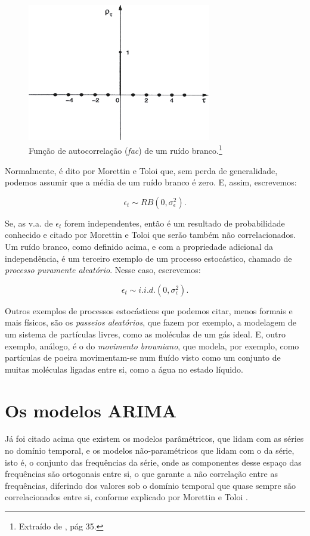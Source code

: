 \begin{figure}[htb]
\centering
\includegraphics[width=8cm]{figuras/fac_ruido}
\caption{Função de autocorrelação (\emph{fac}) de um ruído branco.\footnote{Extraído de \citep{morettin}, pág 35.}}
\label{fig:fac_ruido}
\end{figure}

Normalmente, é dito por Morettin e Toloi \citep{morettin} que, sem perda de generalidade, podemos assumir que a média de um ruído branco é zero. E, assim, escrevemos:

\[ \epsilon_t \sim RB (0, \sigma_\epsilon^2). \]

Se, as v.a. de $\epsilon_t$ forem independentes, então é um resultado de probabilidade conhecido e citado por Morettin e Toloi \citep{morettin} que serão também não correlacionados. Um ruído branco, como definido acima, e com a propriedade adicional da independência, é um terceiro exemplo de um processo estocástico, chamado de \emph{processo puramente aleatório}. Nesse caso, escrevemos:

\[ \epsilon_t \sim i.i.d. (0, \sigma_\epsilon^2). \]

Outros exemplos de processos estocásticos que podemos citar, menos formais e mais físicos, são os \emph{passeios aleatórios}, que fazem por exemplo, a modelagem de um sistema de partículas livres, como as moléculas de um gás ideal. E, outro exemplo, análogo, é o do \emph{movimento browniano}, que modela, por exemplo, como partículas de poeira movimentam-se num fluído visto como um conjunto de muitas moléculas ligadas entre si, como a água no estado líquido.

\section{Os modelos ARIMA}

Já foi citado acima que existem os modelos parâmétricos, que lidam com as séries no domínio temporal, e os modelos não-paramétricos que lidam com o  da série, isto é, o conjunto das frequências da série, onde as componentes desse espaço das frequências são ortogonais entre si, o que garante a não correlação entre as frequências, diferindo dos valores sob o domínio temporal que quase sempre são correlacionados entre si, conforme explicado por Morettin e Toloi \citep{morettin}.

